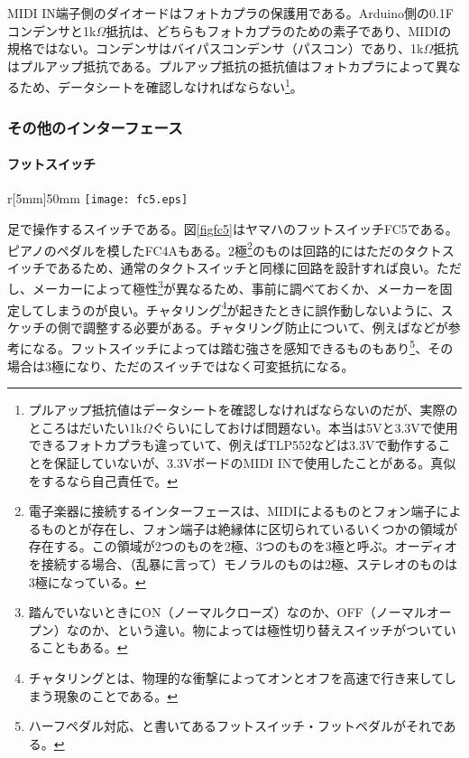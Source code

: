 \documentclass[uplatex, 10pt, dvipdfmx]{jsarticle}
\numberwithin{equation}{section}
\begin{document}
MIDI IN端子側のダイオードはフォトカプラの保護用である。Arduino側の0.1{\textmu}Fコンデンサと1k$\Omega$抵抗は、どちらもフォトカプラのための素子であり、MIDIの規格ではない。コンデンサはバイパスコンデンサ（パスコン）であり、1k$\Omega$抵抗はプルアップ抵抗である。プルアップ抵抗の抵抗値はフォトカプラによって異なるため、データシートを確認しなければならない\footnote{プルアップ抵抗値はデータシートを確認しなければならないのだが、実際のところはだいたい1k$\Omega$ぐらいにしておけば問題ない。本当は5Vと3.3Vで使用できるフォトカプラも違っていて、例えばTLP552などは3.3Vで動作することを保証していないが、3.3VボードのMIDI INで使用したことがある。真似をするなら自己責任で。}。

\subsubsection{その他のインターフェース}
\paragraph{フットスイッチ}

\begin{wrapfigure}{r}[5mm]{50mm}
  \centering
  \texttt{[image: fc5.eps]}
  \caption{ヤマハFC5。画像は\href{https://jp.yamaha.com/products/music_production/accessories/fc5/index.html}{ヤマハ公式サイト}から引用。}
  \label{figfc5}
\end{wrapfigure}

足で操作するスイッチである。図\ref{figfc5}はヤマハのフットスイッチFC5である。ピアノのペダルを模したFC4Aもある。2極\footnote{電子楽器に接続するインターフェースは、MIDIによるものとフォン端子によるものとが存在し、フォン端子は絶縁体に区切られているいくつかの領域が存在する。この領域が2つのものを2極、3つのものを3極と呼ぶ。オーディオを接続する場合、（乱暴に言って）モノラルのものは2極、ステレオのものは3極になっている。}のものは回路的にはただのタクトスイッチであるため、通常のタクトスイッチと同様に回路を設計すれば良い。ただし、メーカーによって極性\footnote{踏んでいないときにON（ノーマルクローズ）なのか、OFF（ノーマルオープン）なのか、という違い。物によっては極性切り替えスイッチがついていることもある。}が異なるため、事前に調べておくか、メーカーを固定してしまうのが良い。チャタリング\footnote{チャタリングとは、物理的な衝撃によってオンとオフを高速で行き来してしまう現象のことである。}が起きたときに誤作動しないように、スケッチの側で調整する必要がある。チャタリング防止について、例えば\cite{チャタリング防止}などが参考になる。フットスイッチによっては踏む強さを感知できるものもあり\footnote{ハーフペダル対応、と書いてあるフットスイッチ・フットペダルがそれである。}、その場合は3極になり、ただのスイッチではなく可変抵抗になる。
\end{document}
